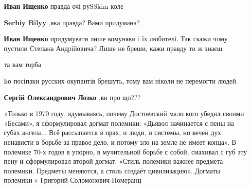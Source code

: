 \begin{itemize}
\begin{itemize}
\textbf{Иван Ищенко} правда очі руSSkim коле

 
\textbf{Serhiy Bilyy} ,яка правда? Вами придумана?

 
\textbf{Иван Ищенко} придумувати лише комуняки і їх любителі.
Так скажи чому пустили Степана Андрійовича? Лише не бреши, кажи правду ти ж знаєш

\end{itemize}

 
та вам торба

 
Бо посіпаки русских окупантів брешуть, тому вам ніколи не перемогти людей.

\begin{itemize}
 
\textbf{Сергій Олександрович Лозко} ,ви про що???
\end{itemize}


«Только в 1970 году, вдумываясь, почему Достоевский мало кого убедил своими
«Бесами», я сформулировал догмат полемики: «Дьявол начинается с пены на губах
ангела... Всё рассыпается в прах, и люди, и системы, но вечен дух ненависти в
борьбе за правое дело, и потому зло на земле не имеет конца». В полемике 70-х
годов я упорно, в мучительной борьбе с собой, смахивал с губ эту пену и
сформулировал второй догмат: «Стиль полемики важнее предмета полемики. Предметы
меняются, а стиль создаёт цивилизацию».  Догматы полемики » Григорий
Соломонович Померанц


\end{itemize}
